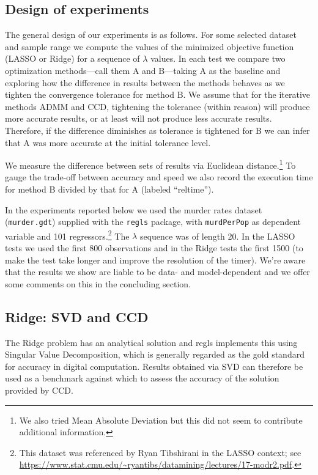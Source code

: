 \documentclass{article}
\begin{document}
\subsection*{Design of experiments}

The general design of our experiments is as follows. For some selected
dataset and sample range we compute the values of the minimized
objective function (LASSO or Ridge) for a sequence of $\lambda$
values. In each test we compare two optimization methods---call them A
and B---taking A as the baseline and exploring how the difference in
results between the methods behaves as we tighten the convergence
tolerance for method B. We assume that for the iterative methods ADMM
and CCD, tightening the tolerance (within reason) will produce more
accurate results, or at least will not produce less accurate
results. Therefore, if the difference diminishes as tolerance is
tightened for B we can infer that A was more accurate at the initial
tolerance level.

We measure the difference between sets of results via Euclidean
distance.\footnote{We also tried Mean Absolute Deviation but this did
  not seem to contribute additional information.}  To gauge the
trade-off between accuracy and speed we also record the execution time
for method B divided by that for A (labeled ``reltime'').

In the experiments reported below we used the murder rates dataset
(\texttt{murder.gdt}) supplied with the \texttt{regls} package, with
\texttt{murdPerPop} as dependent variable and 101
regressors.\footnote{This dataset was referenced by Ryan Tibshirani in
  the LASSO context; see
  \url{https://www.stat.cmu.edu/~ryantibs/datamining/lectures/17-modr2.pdf}.}
The $\lambda$ sequence was of length 20. In the LASSO tests we used
the first 800 observations and in the Ridge tests the first 1500 (to
make the test take longer and improve the resolution of the
timer). We're aware that the results we show are liable to be data-
and model-dependent and we offer some comments on this in the
concluding section.

\subsection*{Ridge: SVD and CCD}

The Ridge problem has an analytical solution and \textsf{regls}
implements this using Singular Value Decomposition, which is generally
regarded as the gold standard for accuracy in digital
computation. Results obtained via SVD can therefore be used as a
benchmark against which to assess the accuracy of the solution
provided by CCD.
\end{document}
